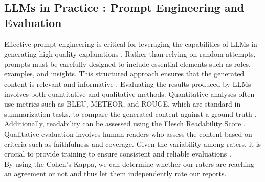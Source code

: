 \documentclass[preprint,12pt]{elsarticle}
\begin{document}
\subsection{LLMs in Practice : Prompt Engineering and Evaluation}

Effective prompt engineering is critical for leveraging the capabilities of LLMs in generating high-quality explanations \cite{Chen2024}. Rather than relying on random attempts, prompts must be carefully designed to include essential elements such as roles, examples, and insights. This structured approach ensures that the generated content is relevant and informative \cite{White2023}. Evaluating the results produced by LLMs involves both quantitative and qualitative methods. Quantitative analyses often use metrics such as BLEU, METEOR, and ROUGE, which are standard in summarization tasks, to compare the generated content against a ground truth \cite{Papineni2002, Lin2004}. Additionally, readability can be assessed using the Flesch Readability Score \cite{Cooperman2024}. Qualitative evaluation involves human readers who assess the content based on criteria such as faithfulness and coverage. Given the variability among raters, it is crucial to provide training to ensure consistent and reliable evaluations \cite{Naismith2023}.\\ By using the Cohen's Kappa, we can determine whether our raters are reaching an agreement or not and thus let them independently rate our reports. \\
\end{document}
